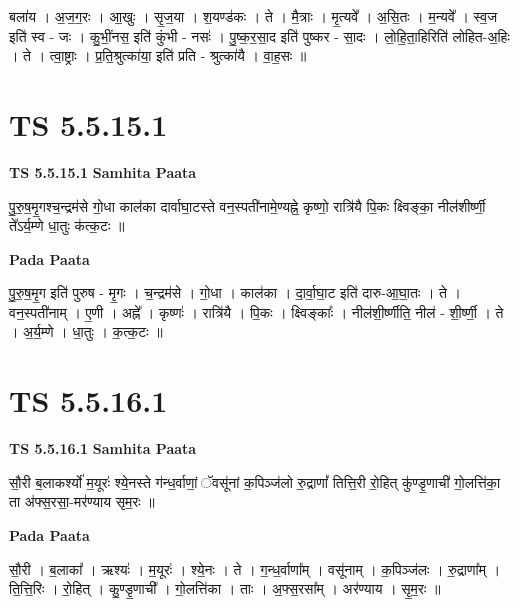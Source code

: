 \documentclass[17pt]{extarticle}
\begin{document}
बला॑य । अ॒ज॒ग॒रः । आ॒खुः । सृ॒ज॒या । श॒यण्ड॑कः । ते । मै॒त्राः । मृ॒त्यवे᳚ । अ॒सि॒तः । म॒न्यवे᳚ । स्व॒ज इति॑ स्व - जः । कु॒भीं॒नस॒ इति॑ कुंभी - नसः॑ । पु॒ष्क॒र॒सा॒द इति॑ पुष्कर - सा॒दः । लो॒हि॒ता॒हिरिति॑ लोहित-अ॒हिः । ते । त्वा॒ष्ट्राः । प्र॒ति॒श्रुत्का॑या॒ इति॑ प्रति - श्रुत्का॑यै । वा॒ह॒सः ॥  \newline




\section*{ TS 5.5.15.1 }

\textbf{TS 5.5.15.1 } \newline
\textbf{Samhita Paata} \newline

पु॒रु॒ष॒मृ॒गश्च॒न्द्रम॑से गो॒धा काल॑का दार्वाघा॒टस्ते वन॒स्पती॑नामे॒ण्यह्ने॒ कृष्णो॒ रात्रि॑यै पि॒कः क्ष्विङ्का॒ नील॑शीर्ष्णी॒ ते᳚ऽर्य॒म्णे धा॒तुः क॑त्क॒टः ॥ \newline

\textbf{Pada Paata} \newline

पु॒रु॒ष॒मृ॒ग इति॑ पुरुष - मृ॒गः । च॒न्द्रम॑से । गो॒धा । काल॑का । दा॒र्वा॒घा॒ट इति॑ दारु-आ॒घा॒तः । ते । वन॒स्पती॑नाम् । ए॒णी । अह्ने᳚ । कृष्णः॑ । रात्रि॑यै । पि॒कः । क्ष्विङ्काः᳚ । नील॑शी॒र्ष्णीति॒ नील॑ - शी॒र्ष्णी॒ । ते । अ॒र्य॒म्णे । धा॒तुः । क॒त्क॒टः ॥  \newline




\section*{ TS 5.5.16.1 }

\textbf{TS 5.5.16.1 } \newline
\textbf{Samhita Paata} \newline

सौ॒री ब॒लाकर्श्यो॑ म॒यूरः॑ श्ये॒नस्ते ग॑न्ध॒र्वाणां॒ ॅवसू॑नां क॒पिञ्ज॑लो रु॒द्राणां᳚ तित्ति॒री रो॒हित् कु॑ण्डृ॒णाची॑ गो॒लत्ति॑का॒ ता अ॑फ्स॒रसा॒-मर॑ण्याय सृम॒रः ॥ \newline

\textbf{Pada Paata} \newline

सौ॒री । ब॒लाका᳚ । ऋश्यः॑ । म॒यूरः॑ । श्ये॒नः । ते । ग॒न्ध॒र्वाणा᳚म् । वसू॑नाम् । क॒पिञ्ज॑लः । रु॒द्राणा᳚म् । ति॒त्ति॒रिः । रो॒हित् । कु॒ण्डृ॒णाची᳚ । गो॒लत्ति॑का । ताः । अ॒फ्स॒रसा᳚म् । अर॑ण्याय । सृ॒म॒रः ॥  \newline
\end{document}
